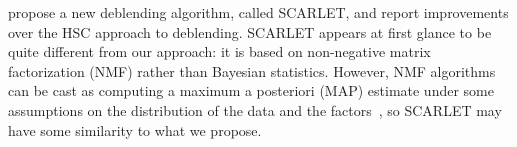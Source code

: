 \cite{melchior2018scarlet} propose a new deblending algorithm, called SCARLET, and report improvements over the HSC approach to deblending.
SCARLET appears at first glance to be quite different from our approach:
it is based on non-negative matrix factorization (NMF) rather than Bayesian statistics.
However, NMF algorithms can be cast as computing a maximum a posteriori (MAP) estimate under some assumptions on the distribution of the data and the factors~\citep{schmidt2009bayesian}, so SCARLET may have some similarity to what we propose.

